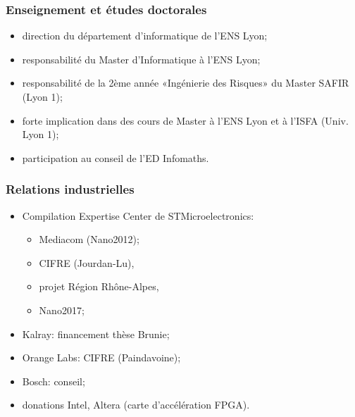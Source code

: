 \documentclass[mathsans]{beamer}
\begin{document}
\begin{frame}
\frametitle{Enseignement et études doctorales}
\begin{itemize}
   \item \alert{direction du département d'informatique} de l'ENS Lyon;
   \item responsabilité du Master d'Informatique à l'ENS Lyon;
   \item responsabilité de la 2ème année «Ing\'enierie des Risques» du Master SAFIR (Lyon 1);
   \item forte implication dans des cours de Master à l'ENS Lyon et à l'ISFA (Univ. Lyon 1);
   \item participation au conseil de l'ED Infomaths.
\end{itemize}
\end{frame}

\begin{frame}
\frametitle{Relations industrielles}
\begin{itemize}
    \item Compilation Expertise Center de \alert{STMicroelectronics:  }
    \begin{itemize}
          \item Mediacom (Nano2012);
          \item CIFRE (Jourdan-Lu), 
          \item projet Région Rhône-Alpes, 
          \item Nano2017;
     \end{itemize}
    \item \alert{Kalray:} financement thèse Brunie;
    \item \alert{Orange Labs:} CIFRE (Paindavoine);
    \item \alert{Bosch:} conseil;
    \item donations \alert{Intel}, \alert{Altera} (carte d'accélération FPGA).
 \end{itemize}
\end{frame}
\end{document}

